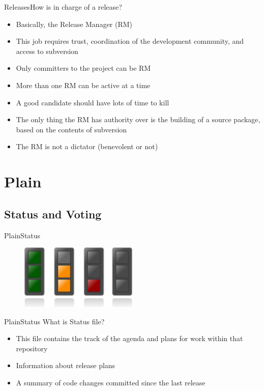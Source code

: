 \documentclass[10pt]{beamer}
\begin{document}
\begin{frame}{Releases}{How is in charge of a release?}
  \begin{itemize}
    \item Basically, the Release Manager (RM) \pause
    \item This job requires trust, coordination of the development community,
          and access to subversion \pause
    \item Only committers to the project can be RM \pause
    \item More than one RM can be active at a time \pause
    \item A good candidate should have lots of time to kill \pause
    \item The only thing the RM has authority over is the building of a
          source package, based on the contents of subversion \pause
    \item The RM is not a dictator (benevolent or not)
  \end{itemize}
\end{frame}

\section{Plain}

\subsection{Status and Voting}

\begin{frame}{Plain}{Status}
  \begin{figure}[ht]
    \centering
    \includegraphics[width=0.5\textwidth, keepaspectratio=true]{images/status.png}
  \end{figure}
\end{frame}

\begin{frame}{Plain}{Status}
  What is Status file? \pause
  \begin{itemize}
    \item This file contains the track of the agenda and plans for work within
          that repository \pause
    \item Information about release plans \pause
    \item A summary of code changes committed since the last release
  \end{itemize}
\end{frame}
\end{document}

